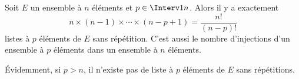 \documentclass[a4paper,10pt]{report}
\begin{document}
\begin{preuve} 

\vspace{3cm}
%
\end{preuve}
 
%
%



\begin{prop}
Soit $E$ un ensemble à $n$ éléments et $p \in \Interv 1n$. Alors il y a exactement 
\[  n \times (n-1) \times \cdots \times (n-p+1)  = \frac{n!}{(n-p)!} \]
listes à $p$ éléments de $E$ sans répétition. C'est aussi le nombre d'injections d'un ensemble à $p$ éléments dans un ensemble à $n$ éléments.
\end{prop}

\begin{preuve} 
\vspace{7cm}
\end{preuve}

\begin{rem} 
Évidemment, si $p>n$, il n'existe pas de liste à $p$ éléments de $E$ sans répétitions.
\end{rem}
%
%
\end{document}
